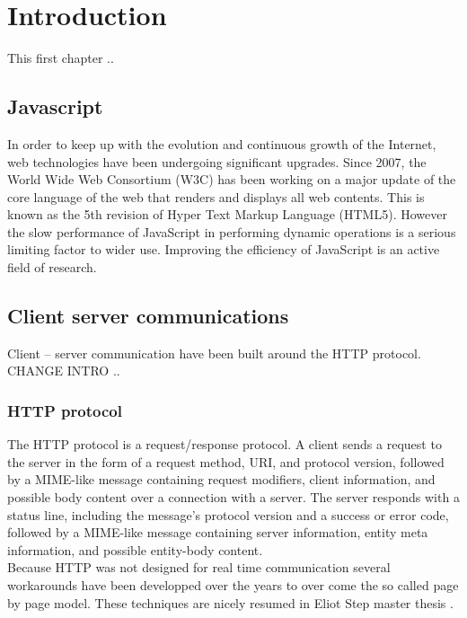 \chapter{Introduction} 
\label{Chapter1}

This first chapter ..\\

\section{Javascript}

In order to keep up with the evolution and continuous growth of the Internet, web technologies have been undergoing significant upgrades. Since 2007, the World Wide Web Consortium (W3C) has been working on a major update of the core language of the web that renders and displays all web contents. This is known as the 5th revision of Hyper Text Markup Language (HTML5). 
However the slow performance of JavaScript in performing dynamic operations is a serious limiting factor to wider use.  Improving the efficiency of JavaScript is an active field of research.\\

\section{Client server communications}

Client – server communication have been built around the HTTP protocol. CHANGE INTRO ..\\

\subsection{HTTP protocol}

The HTTP protocol is a request/response protocol. A client sends a request to the server in the form of a request method, URI, and protocol version, followed by a MIME-like message containing request modifiers, client information, and possible body content over a connection with a server. The server responds with a status line, including the message's protocol version and a success or error code, followed by a MIME-like message containing server information, entity meta information, and possible entity-body content. \citep{Reference1}\\

Because HTTP was not designed for real time communication several workarounds have been developped over the years to over come the so called page by page model. These techniques are nicely resumed in Eliot Step master thesis \citep{Reference2}.

